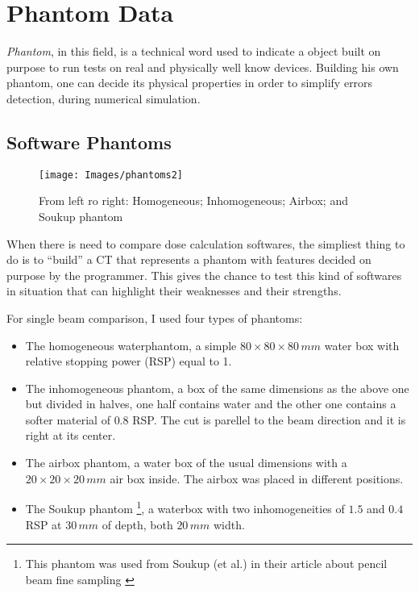 \documentclass[12pt, a4paper, twoside]{book}
\begin{document}

\section{Phantom Data}
\emph{Phantom}, in this field, is a technical word used to indicate a object built on purpose to run tests on real and physically well know devices. Building his own phantom, one can decide its physical properties in order to simplify errors detection, during numerical simulation. 

\subsection{Software Phantoms}
\label{sec:pha}
\begin{figure}[h]
{\texttt{[image: Images/phantoms2]}}
\caption{From left ro right: Homogeneous; Inhomogeneous; Airbox; and Soukup phantom}
\label{fig:phantoms}
\end{figure}
When there is need to compare dose calculation softwares, the simpliest thing to do is to ``build'' a CT that represents a phantom with features decided on purpose by the programmer. This gives the chance to test this kind of softwares in situation that can highlight their weaknesses and their strengths.


For single beam comparison, I used four types of phantoms:
\begin{itemize}
\item The homogeneous waterphantom, a simple $80\times80\times80\,mm$ water box with relative stopping power (RSP) equal to 1.
\item The inhomogeneous phantom, a box of the same dimensions as the above one but divided in halves, one half contains water and the other one contains a softer material of $0.8$ RSP. The cut is parellel to the beam direction and it is right at its center.
\item The airbox phantom, a water box of the usual dimensions with a $20\times20\times20\,mm$ air box inside. The airbox was placed in different positions.
\item The Soukup phantom \footnote{This phantom was used from Soukup (et al.) in their article about pencil beam fine sampling \cite{souk:pba}}, a waterbox with two inhomogeneities of $1.5$ and $0.4$ RSP at $30\,mm$ of depth, both $20\,mm$ width.
\end{itemize}
\end{document}
